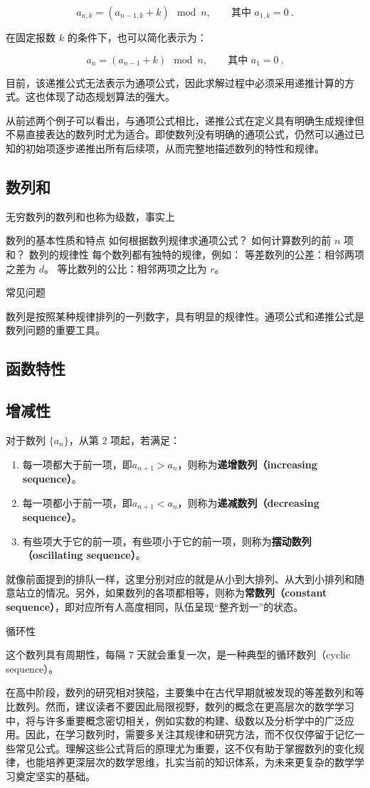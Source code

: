 \begin{equation}
a_{n,k} = (a_{n-1,k} + k) \mod n, \qquad \text{其中 } a_{1,k} = 0~.
\end{equation}

在固定报数 $k$ 的条件下，也可以简化表示为：

\begin{equation}
a_n = (a_{n-1} + k) \mod n, \qquad \text{其中 } a_{1} = 0~.
\end{equation}

目前，该递推公式无法表示为通项公式，因此求解过程中必须采用递推计算的方式。这也体现了动态规划算法的强大。

从前述两个例子可以看出，与通项公式相比，递推公式在定义具有明确生成规律但不易直接表达的数列时尤为适合。即使数列没有明确的通项公式，仍然可以通过已知的初始项逐步递推出所有后续项，从而完整地描述数列的特性和规律。

\subsection{数列和}

无穷数列的数列和也称为级数，事实上


数列的基本性质和特点
如何根据数列规律求通项公式？
如何计算数列的前 $n$ 项和？
数列的规律性
每个数列都有独特的规律，例如：
等差数列的公差：相邻两项之差为 $d$。
等比数列的公比：相邻两项之比为 $r$。

常见问题


数列是按照某种规律排列的一列数字，具有明显的规律性。通项公式和递推公式是数列问题的重要工具。
\subsection{函数特性}

\subsection{增减性}

对于数列 $\{a_n\}$，从第 $2$ 项起，若满足：
\begin{enumerate}
\item 每一项都大于前一项，即$a_{n+1} > a_n$，则称为\textbf{递增数列（increasing sequence）}。
\item 每一项都小于前一项，即$a_{n+1} < a_n$，则称为\textbf{递减数列（decreasing sequence）}。
\item 有些项大于它的前一项，有些项小于它的前一项，则称为\textbf{摆动数列（oscillating sequence）}。
\end{enumerate}
就像前面提到的排队一样，这里分别对应的就是从小到大排列、从大到小排列和随意站立的情况。另外，如果数列的各项都相等，则称为\textbf{常数列（constant sequence）}，即对应所有人高度相同，队伍呈现“整齐划一”的状态。



循环性


这个数列具有周期性，每隔 7 天就会重复一次，是一种典型的循环数列（cyclic sequence）。

在高中阶段，数列的研究相对狭隘，主要集中在古代早期就被发现的等差数列和等比数列。然而，建议读者不要因此局限视野，数列的概念在更高层次的数学学习中，将与许多重要概念密切相关，例如实数的构建、级数以及分析学中的广泛应用。因此，在学习数列时，需要多关注其规律和研究方法，而不仅仅停留于记忆一些常见公式。理解这些公式背后的原理尤为重要，这不仅有助于掌握数列的变化规律，也能培养更深层次的数学思维，扎实当前的知识体系，为未来更复杂的数学学习奠定坚实的基础。